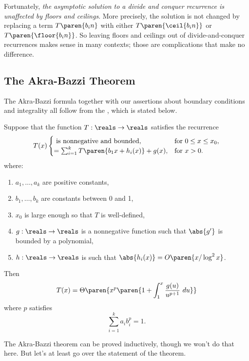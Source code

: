 Fortunately, \emph{the asymptotic solution to a divide and conquer
  recurrence is unaffected by floors and ceilings}.  More precisely,
the solution is not changed by replacing a term $T\paren{b_i n}$ with
either $T\paren{\ceil{b_i n}}$ or $T\paren{\floor{b_i n}}$.  So
leaving floors and ceilings out of divide-and-conquer recurrences
makes sense in many contexts; those are complications that make no
difference.

\subsection{The Akra-Bazzi Theorem}

The Akra-Bazzi formula together with our assertions about boundary
conditions and integrality all follow from the , which is stated below.

\begin{theorem}
\label{th:akra-bazzi}
Suppose that the function $T: \reals \to \reals$ satisfies
the recurrence
\[
T(x) 
\begin{cases}
\text{ is nonnegative and bounded}, & \text{for $0 \leq x \leq x_0$}, \\
= \sum_{i=1}^k T\paren{b_1x + h_i(x)} + g(x), & \text{for $x > 0$}.
\end{cases}
\]
where:
\begin{enumerate}
\item $a_1, \dots, a_k$ are positive constants,
\item $b_1, \dots, b_k$ are constants between 0 and 1,
\item $x_0$ is large enough so that $T$ is well-defined,
\item $g:\reals \to \reals$ is a nonnegative function such that $\abs{g'}$ is
  bounded by a polynomial,
\item $h:\reals \to \reals$ is such that $\abs{h_i(x)} = O\paren{x / \log^2 x}$.
\end{enumerate}
Then
\[
T(x) = \Theta\paren{x^p \paren{1 + \int_1^x \frac{g(u)}{u^{p+1}} \ du}}
\]
where $p$ satisfies
\begin{equation*}
\sum_{i=1}^k {a_i b_i^p} = 1.
\end{equation*}
\end{theorem}


The Akra-Bazzi theorem can be proved inductively, though we won't do
that here.  But let's at least go over the statement of the theorem.

